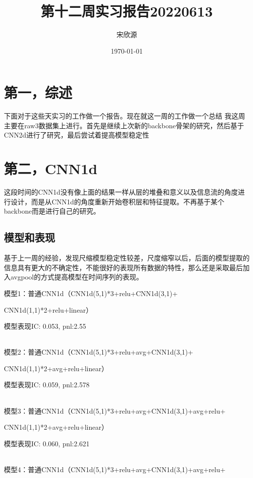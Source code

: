 \documentclass[11pt]{ctexart}
\begin{document}
\title{第十二周实习报告20220613}
\author{宋欣源}
\date{\today}

\maketitle %


\section{第一，综述}

下面对于这些天实习的工作做一个报告。现在就这一周的工作做一个总结
我这周主要在raw3数据集上进行。首先是继续上次新的backbone骨架的研究，然后基于CNN2d进行了研究，最后尝试着提高模型稳定性

\section{第二，CNN1d}
这段时间的CNN1d没有像上面的结果一样从层的堆叠和意义以及信息流的角度进行设计，而是从CNN1d的角度重新开始卷积层和特征提取。不再基于某个backbone而是进行自己的研究。

\subsection{模型和表现}

基于上一周的经验，发现尺缩模型稳定性较差，尺度缩窄以后，后面的模型提取的信息具有更大的不确定性，不能很好的表现所有数据的特性，那么还是采取最后加入avgpool的方式提高模型在时间序列的表现。

模型1：普通CNN1d（CNN1d(5,1)*3+relu+CNN1d(3,1)+

CNN1d(1,1)*2+relu+linear）

模型表现{\kaishu \small IC: 0.053, pnl:2.55}

~\\
模型2：普通CNN1d（CNN1d(5,1)*3+relu+avg+CNN1d(3,1)+

CNN1d(1,1)*2+avg+relu+linear）

模型表现{\kaishu \small IC: 0.059, pnl:2.578}


~\\
模型3：普通CNN1d（CNN1d(5,1)*3+relu+avg+CNN1d(3,1)+avg+relu+

CNN1d(1,1)*2+avg+relu+linear）

模型表现{\kaishu \small IC: 0.060, pnl:2.621}


~\\
模型4：普通CNN1d（CNN1d(5,1)*3+relu+avg+CNN1d(3,1)+avg+relu+
\end{document}
